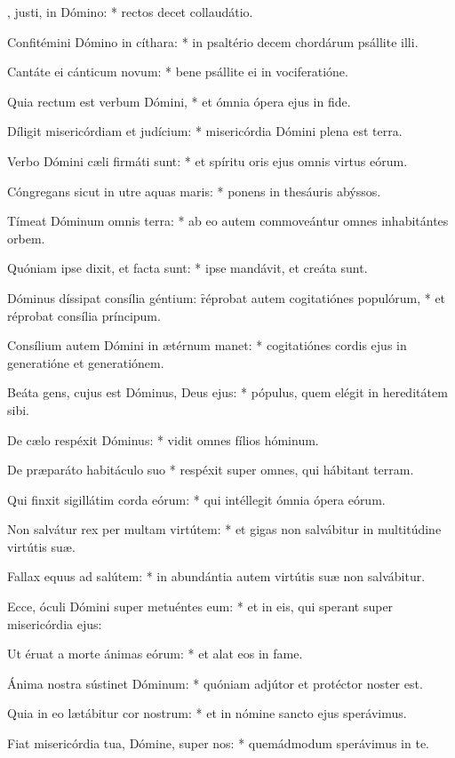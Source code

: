 \begin{psalmus}

    , justi, in Dómino: * rectos decet collaudátio.

    Confitémini Dómino in cíthara: * in psaltério decem chordárum psállite illi.

    Cantáte ei cánticum novum: * bene psállite ei in vociferatióne.

    Quia rectum est verbum Dómini, * et ómnia ópera ejus in fide.

    Díligit misericórdiam et judícium: * misericórdia Dómini plena est terra.

    Verbo Dómini cæli firmáti sunt: * et spíritu oris ejus omnis virtus eórum.

    Cóngregans sicut in utre aquas maris: * ponens in thesáuris abýssos.

    Tímeat Dóminum omnis terra: * ab eo autem commoveántur omnes inhabitántes orbem.

    Quóniam ipse dixit, et facta sunt: * ipse mandávit, et creáta sunt.

    Dóminus díssipat consília géntium: \f réprobat autem cogitatiónes populórum, * et réprobat consília príncipum.

    Consílium autem Dómini in ætérnum manet: * cogitatiónes cordis ejus in generatióne et generatiónem.

    Beáta gens, cujus est Dóminus, Deus ejus: * pópulus, quem elégit in hereditátem sibi.

    De cælo respéxit Dóminus: * vidit omnes fílios hóminum.

    De præparáto habitáculo suo * respéxit super omnes, qui hábitant terram.

    Qui finxit sigillátim corda eórum: * qui intéllegit ómnia ópera eórum.

    Non salvátur rex per multam virtútem: * et gigas non salvábitur in multitúdine virtútis suæ.

    Fallax equus ad salútem: * in abundántia autem virtútis suæ non salvábitur.

    Ecce, óculi Dómini super metuéntes eum: * et in eis, qui sperant super misericórdia ejus:

    Ut éruat a morte ánimas eórum: * et alat eos in fame.

    Ánima nostra sústinet Dóminum: * quóniam adjútor et protéctor noster est.

    Quia in eo lætábitur cor nostrum: * et in nómine sancto ejus sperávimus.

    Fiat misericórdia tua, Dómine, super nos: * quemádmodum sperávimus in te.

\end{psalmus}

